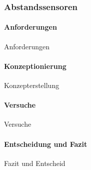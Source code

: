 \documentclass[main.tex]{subfiles} %
\begin{document}

\subsubsection{Abstandssensoren}

\paragraph{Anforderungen}
Anforderungen

\paragraph{Konzeptionierung}
Konzepterstellung

\paragraph{Versuche}
Versuche

\paragraph{Entscheidung und Fazit}
Fazit und Entscheid
\end{document}
